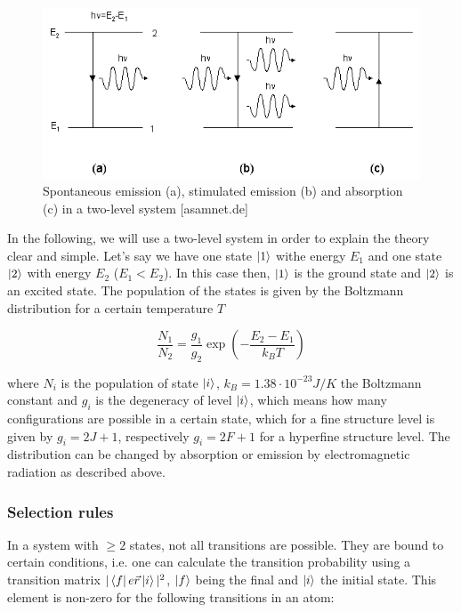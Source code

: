 \begin{figure}[H]
\centering \includegraphics[width = \textwidth]{BilderTheo/absorptionemission.png}
\caption{Spontaneous emission (a), stimulated emission (b) and absorption (c) in a two-level system [asamnet.de]}
\end{figure}

In the following, we will use a two-level system in order to explain the theory clear and simple. Let's say we have one state $\ket{1}$ withe energy $E_1$ and one state $\ket{2}$ with energy $E_2$ ($E_1 < E_2$). In this case then, $\ket{1}$ is the ground state and $\ket{2}$ is an excited state. The population of the states is given by the Boltzmann distribution for a certain temperature $T$

$$\frac{N_1}{N_2} = \frac{g_1}{g_2}\exp\left(-\frac{E_2-E_1}{k_BT} \right)$$

where $N_i$ is the population of state $\ket{i}$, $k_B = 1.38\cdot10^{-23} J/K$ the Boltzmann constant and $g_i$ is the degeneracy of level $\ket{i}$, which means how many configurations are possible in a certain state, which for a fine structure level is given by $g_i = 2J +1$, respectively $g_i = 2F+1$ for a hyperfine structure level. The distribution can be changed by absorption or emission by electromagnetic radiation as described above. 

\subsubsection{Selection rules}
\label{sec:selection}

In a system with $\geq 2$ states, not all transitions are possible. They are bound to certain conditions, i.e. one can calculate the transition probability using a transition matrix $|\bra{f}e\vec r\ket{i}|^2$, $\ket{f}$ being the final and $\ket{i}$ the initial state. This element is non-zero for the following transitions in an atom:


